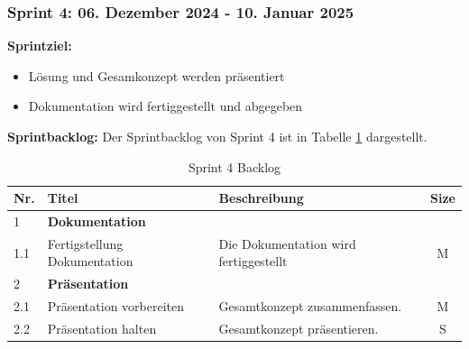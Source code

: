 \newpage
\subsubsection{Sprint 4: 06. Dezember 2024 - 10. Januar 2025}

\textbf{Sprintziel:}
\begin{itemize}
    \item Lösung und Gesamkonzept werden präsentiert
    \item Dokumentation wird fertiggestellt und abgegeben
\end{itemize}

\textbf{Sprintbacklog:} Der Sprintbacklog von Sprint 4 ist in Tabelle \ref{table:sprint4-backlog} dargestellt.

\begin{table}[H]
\centering
\small
\begin{tabularx}{\textwidth}{|l|l|X|c|}
\hline
  \textbf{Nr.} & \textbf{Titel} & \textbf{Beschreibung} & \textbf{Size}\\
  \hline
  1  & \textbf{Dokumentation} &&\\
  \hline
  1.1  & Fertigstellung Dokumentation & Die Dokumentation wird fertiggestellt & M\\
  \hline
  2 & \textbf{Präsentation} && \\
  \hline
  2.1 & Präsentation vorbereiten & Gesamtkonzept zusammenfassen. & M \\
  \hline
  2.2 &Präsentation halten & Gesamtkonzept präsentieren. & S \\
  \hline
\end{tabularx}
\caption{Sprint 4 Backlog}
\label{table:sprint4-backlog}
\end{table}

